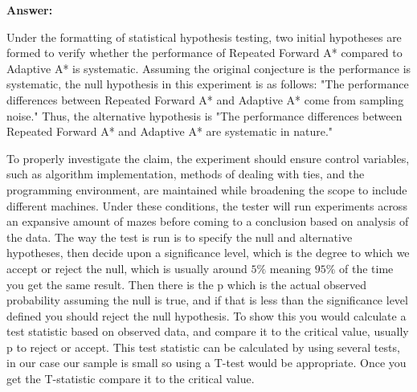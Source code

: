 \documentclass{article}
\begin{document}
{\color{blue} \textbf{Answer:}

Under the formatting of statistical hypothesis testing, two initial hypotheses are formed to verify whether the performance of Repeated Forward A* compared to Adaptive A* is systematic. Assuming the original conjecture is the performance is systematic, the null hypothesis in this experiment is as follows: "The performance differences between Repeated Forward A* and Adaptive A* come from sampling noise." Thus, the alternative hypothesis is "The performance differences between Repeated Forward A* and Adaptive A* are systematic in nature."

To properly investigate the claim, the experiment should ensure control variables, such as algorithm implementation, methods of dealing with ties, and the programming environment, are maintained while broadening the scope to include different machines. Under these conditions, the tester will run experiments across an expansive amount of mazes before coming to a conclusion based on analysis of the data. The way the test is run is to specify the null and alternative hypotheses, then decide upon a significance level, which is the degree to which we accept or reject the null, which is usually around $5\%$ meaning $95\%$ of the time you get the same result. Then there is the p which is the actual observed probability assuming the null is true, and if that is less than the significance level defined you should reject the null hypothesis. To show this you would calculate a test statistic based on observed data, and compare it to the critical value, usually p to reject or accept. This test statistic can be calculated by using several tests, in our case our sample is small so using a T-test would be appropriate. Once you get the T-statistic compare it to the critical value.

}
\end{document}

